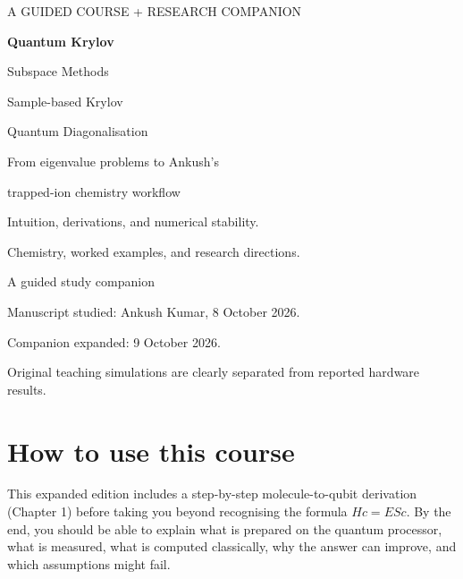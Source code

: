 \documentclass[11pt,a4paper,oneside]{report}
\begin{document}
\begin{titlepage}
\pagecolor{navy}\color{white}
\vspace*{14mm}
{\sffamily\large A GUIDED COURSE + RESEARCH COMPANION\par}
\vspace{15mm}
{\sffamily\bfseries\fontsize{35}{40}\selectfont Quantum Krylov\par Subspace Methods\par}
\vspace{8mm}
{\sffamily\fontsize{25}{30}\selectfont Sample-based Krylov\par Quantum Diagonalisation\par}
\vspace{14mm}
{\Large From eigenvalue problems to Ankush's\par trapped-ion chemistry workflow\par}
\vspace{14mm}
\par
\vspace{5mm}
{\large Intuition, derivations, and numerical stability.\par Chemistry, worked examples, and research directions.\par}
\vfill
{\sffamily\large A guided study companion\par}
\vspace{4mm}
{\normalsize Manuscript studied: Ankush Kumar, 8 October 2026.\par Companion expanded: 9 October 2026.\par}
\vspace{8mm}
{\small Original teaching simulations are clearly separated from reported hardware results.\par}
\end{titlepage}
\nopagecolor\color{black}
\chapter*{How to use this course}
This expanded edition includes a step-by-step molecule-to-qubit derivation (Chapter 1) before taking you beyond recognising the formula $Hc=ESc$. By the end, you should be able to explain what is prepared on the quantum processor, what is measured, what is computed classically, why the answer can improve, and which assumptions might fail.
\end{document}
